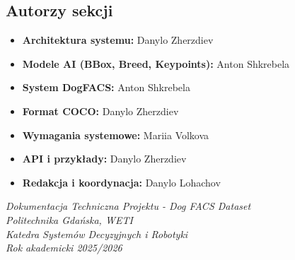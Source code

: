 \documentclass[12pt,a4paper]{article}
\begin{document}
\subsection*{Autorzy sekcji}
\begin{itemize}
    \item \textbf{Architektura systemu:} Danylo Zherzdiev
    \item \textbf{Modele AI (BBox, Breed, Keypoints):} Anton Shkrebela
    \item \textbf{System DogFACS:} Anton Shkrebela
    \item \textbf{Format COCO:} Danylo Zherzdiev
    \item \textbf{Wymagania systemowe:} Mariia Volkova
    \item \textbf{API i przykłady:} Danylo Zherzdiev
    \item \textbf{Redakcja i koordynacja:} Danylo Lohachov
\end{itemize}

\vfill
\begin{center}
\textit{Dokumentacja Techniczna Projektu - Dog FACS Dataset}\\
\textit{Politechnika Gdańska, WETI}\\
\textit{Katedra Systemów Decyzyjnych i Robotyki}\\
\textit{Rok akademicki 2025/2026}
\end{center}
\end{document}
